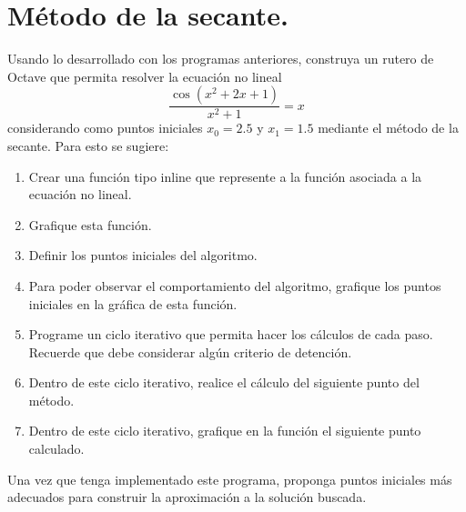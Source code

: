 \documentclass[letter,11pt]{article}
\newcommand\0{\mathbf{0}}
\newcommand{\octave}{{\sc Octave} }
\begin{document}
\section{M\'etodo de la secante.}
Usando lo desarrollado con los programas anteriores, construya un rutero de \octave  que permita resolver la ecuaci\'on no lineal
$$
\frac{\cos(x^2+2x+1)}{x^2+1}=x
$$
considerando como puntos iniciales $x_0=2.5$ y $x_1=1.5$ mediante el m\'etodo de la secante. Para esto se sugiere:
\begin{enumerate}
\item Crear una funci\'on tipo inline que represente a la funci\'on asociada a la ecuaci\'on no lineal.
\item Grafique esta funci\'on.
\item Definir los puntos iniciales del algoritmo.
\item Para poder observar el comportamiento del algoritmo, grafique los puntos iniciales en la gr\'afica de esta funci\'on.
\item Programe un ciclo iterativo que permita hacer los c\'alculos de cada paso. Recuerde que debe considerar alg\'un criterio de detenci\'on.
\item Dentro de este ciclo iterativo, realice el c\'alculo del siguiente punto del m\'etodo.
\item Dentro de este ciclo iterativo, grafique en la funci\'on el siguiente punto calculado.
\end{enumerate}

Una vez que tenga implementado este programa, proponga puntos iniciales m\'as adecuados para construir la aproximaci\'on a la soluci\'on buscada.
\end{document}
